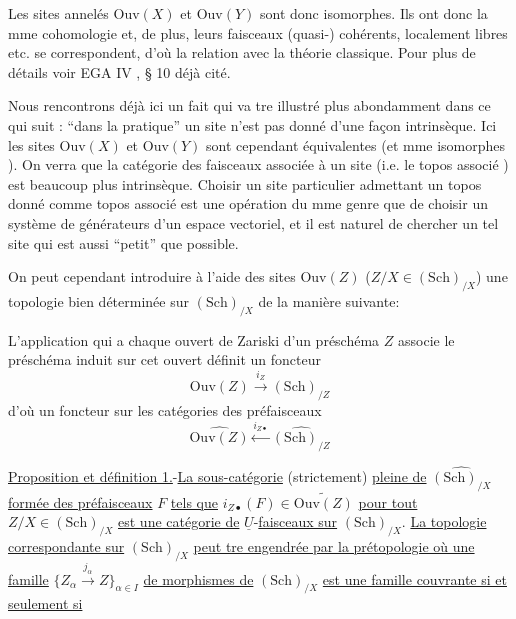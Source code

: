 Les sites annelés $\mathrm{Ouv}(X)$ et $\mathrm{Ouv}(Y)$ sont donc isomorphes. Ils ont donc la mme cohomologie et, de plus, leurs faisceaux (quasi-) cohérents, localement libres etc. se correspondent, d'où la relation avec la théorie classique. Pour plus de détails voir \inserted{[}EGA IV , § 10\inserted{]} déjà cité.

Nous rencontrons déjà ici un fait qui va tre illustré plus abondamment dans ce qui suit : ``dans la pratique'' un site n'est pas donné d'une façon intrinsèque. Ici les sites $\mathrm{Ouv}(X)$ et $\mathrm{Ouv}(Y)$ sont cependant équivalentes (et mme isomorphes ). On verra que la catégorie des faisceaux associée à un site (i.e. le topos associé ) est beaucoup plus intrinsèque. Choisir un site particulier admettant un topos donné comme topos associé est une opération du mme genre que de choisir un système de générateurs d'un espace vectoriel, et il est naturel de chercher un tel site qui est aussi ``petit'' que possible.

On peut cependant introduire à l'aide des sites $\mathrm{Ouv}(Z)$ ($Z/X\in(\mathrm{Sch})_{/X}$) une topologie bien déterminée sur $(\mathrm{Sch})_{/X}$ de la manière suivante:

L'application qui a chaque ouvert de Zariski d'un préschéma $Z$ associe le préschéma induit sur cet ouvert définit un foncteur
\[
\mathrm{Ouv}(Z)\xrightarrow{i_Z}(\mathrm{Sch})_{/Z}
\]
d'où un foncteur sur les catégories des préfaisceaux
\[
\widehat{\mathrm{Ouv}(Z)}\xleftarrow{i_{Z\bullet}}\widehat{(\mathrm{Sch})_{/Z}}
\]

\uline{Proposition et définition 1.}-\uline{La sous-catégorie} (strictement) \uline{pleine de} $\widehat{(\mathrm{Sch})_{/X}}$ \uline{formée des préfaisceaux} $F$ \uline{tels que} $i_{Z\bullet}(F)\in\widetilde{\mathrm{Ouv}(Z)}$ \uline{pour tout} $Z/X\in(\mathrm{Sch})_{/X}$ \uline{est une catégorie de} $\underline{U}$-\uline{faisceaux sur} $(\mathrm{Sch})_{/X}$.  \uline{La topologie correspondante sur} $(\mathrm{Sch})_{/X}$ \uline{peut tre engendrée par la prétopologie où une famille} $\{Z_\alpha\xrightarrow{j_\alpha}Z\}_{\alpha\in I}$ \uline{de morphismes de} $(\mathrm{Sch})_{/X}$ \uline{est une famille couvrante si et seulement si}
